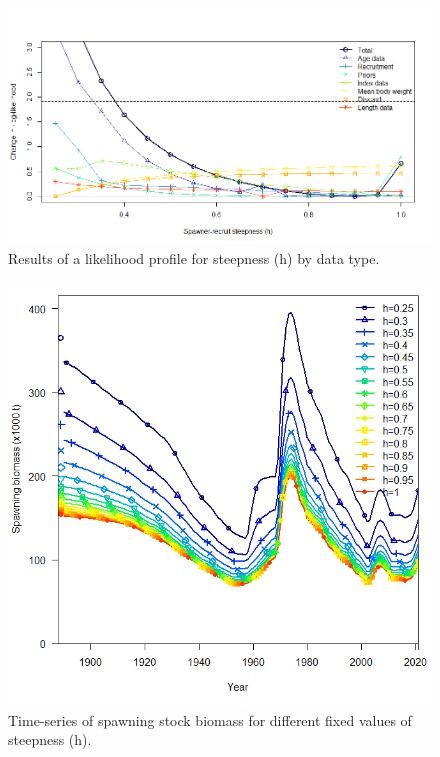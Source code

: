 \documentclass[11pt,
  english,
  a4paper,
]{article}
\begin{document}
\tagmcend\tagstructend


\begin{figure}
\centering
\includegraphics[width=1\textwidth,height=1\textheight]{figs/Hprofile_plot_likelihood.png}
\caption{Results of a likelihood profile for steepness (h) by data type. \label{fig:profile_like_h}}
\end{figure}

\tagmcend\tagstructend


\begin{figure}
\centering
\includegraphics[width=1\textwidth,height=1\textheight]{figs/hprofile_plot_ssb.png}
\caption{Time-series of spawning stock biomass for different fixed values of steepness (h).\label{fig:profile_ssb_h}}
\end{figure}

\tagmcend\tagstructend

\clearpage
\end{document}
